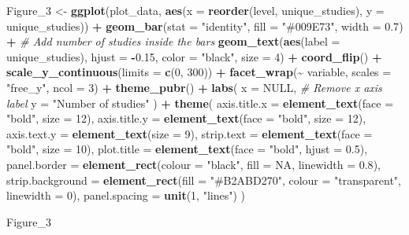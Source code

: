\documentclass[
]{article}
\newenvironment{Shaded}{\begin{snugshade}}{\end{snugshade}}
\newcommand{\AttributeTok}[1]{\textcolor[rgb]{0.13,0.29,0.53}{#1}}
\newcommand{\CommentTok}[1]{\textcolor[rgb]{0.56,0.35,0.01}{\textit{#1}}}
\newcommand{\ConstantTok}[1]{\textcolor[rgb]{0.56,0.35,0.01}{#1}}
\newcommand{\DecValTok}[1]{\textcolor[rgb]{0.00,0.00,0.81}{#1}}
\newcommand{\FloatTok}[1]{\textcolor[rgb]{0.00,0.00,0.81}{#1}}
\newcommand{\FunctionTok}[1]{\textcolor[rgb]{0.13,0.29,0.53}{\textbf{#1}}}
\newcommand{\NormalTok}[1]{#1}
\newcommand{\OtherTok}[1]{\textcolor[rgb]{0.56,0.35,0.01}{#1}}
\newcommand{\SpecialCharTok}[1]{\textcolor[rgb]{0.81,0.36,0.00}{\textbf{#1}}}
\newcommand{\StringTok}[1]{\textcolor[rgb]{0.31,0.60,0.02}{#1}}
\begin{document}
\begin{Shaded}
\begin{Highlighting}[]
\NormalTok{Figure\_3 }\OtherTok{\textless{}{-}} 
  \FunctionTok{ggplot}\NormalTok{(plot\_data, }\FunctionTok{aes}\NormalTok{(}\AttributeTok{x =} \FunctionTok{reorder}\NormalTok{(level, unique\_studies), }\AttributeTok{y =}\NormalTok{ unique\_studies)) }\SpecialCharTok{+}
  \FunctionTok{geom\_bar}\NormalTok{(}\AttributeTok{stat =} \StringTok{"identity"}\NormalTok{, }\AttributeTok{fill =} \StringTok{"\#009E73"}\NormalTok{, }\AttributeTok{width =} \FloatTok{0.7}\NormalTok{) }\SpecialCharTok{+}
  \CommentTok{\# Add number of studies inside the bars}
  \FunctionTok{geom\_text}\NormalTok{(}\FunctionTok{aes}\NormalTok{(}\AttributeTok{label =}\NormalTok{ unique\_studies), }
            \AttributeTok{hjust =} \SpecialCharTok{{-}}\FloatTok{0.15}\NormalTok{, }\AttributeTok{color =} \StringTok{"black"}\NormalTok{, }\AttributeTok{size =} \DecValTok{4}\NormalTok{) }\SpecialCharTok{+}
  \FunctionTok{coord\_flip}\NormalTok{() }\SpecialCharTok{+}
  \FunctionTok{scale\_y\_continuous}\NormalTok{(}\AttributeTok{limits =} \FunctionTok{c}\NormalTok{(}\DecValTok{0}\NormalTok{, }\DecValTok{300}\NormalTok{)) }\SpecialCharTok{+}
  \FunctionTok{facet\_wrap}\NormalTok{(}\SpecialCharTok{\textasciitilde{}}\NormalTok{ variable, }\AttributeTok{scales =} \StringTok{"free\_y"}\NormalTok{, }\AttributeTok{ncol =} \DecValTok{3}\NormalTok{) }\SpecialCharTok{+}
  \FunctionTok{theme\_pubr}\NormalTok{() }\SpecialCharTok{+}
  \FunctionTok{labs}\NormalTok{(}
    \AttributeTok{x =} \ConstantTok{NULL}\NormalTok{,  }\CommentTok{\# Remove x axis label}
    \AttributeTok{y =} \StringTok{"Number of studies"}
\NormalTok{  ) }\SpecialCharTok{+}
  \FunctionTok{theme}\NormalTok{(}
    \AttributeTok{axis.title.x =} \FunctionTok{element\_text}\NormalTok{(}\AttributeTok{face =} \StringTok{"bold"}\NormalTok{, }\AttributeTok{size =} \DecValTok{12}\NormalTok{),}
    \AttributeTok{axis.title.y =} \FunctionTok{element\_text}\NormalTok{(}\AttributeTok{face =} \StringTok{"bold"}\NormalTok{, }\AttributeTok{size =} \DecValTok{12}\NormalTok{),}
    \AttributeTok{axis.text.y =} \FunctionTok{element\_text}\NormalTok{(}\AttributeTok{size =} \DecValTok{9}\NormalTok{),}
    \AttributeTok{strip.text =} \FunctionTok{element\_text}\NormalTok{(}\AttributeTok{face =} \StringTok{"bold"}\NormalTok{, }\AttributeTok{size =} \DecValTok{10}\NormalTok{),}
    \AttributeTok{plot.title =} \FunctionTok{element\_text}\NormalTok{(}\AttributeTok{face =} \StringTok{"bold"}\NormalTok{, }\AttributeTok{hjust =} \FloatTok{0.5}\NormalTok{),}
    \AttributeTok{panel.border =} \FunctionTok{element\_rect}\NormalTok{(}\AttributeTok{colour =} \StringTok{"black"}\NormalTok{, }\AttributeTok{fill =} \ConstantTok{NA}\NormalTok{, }\AttributeTok{linewidth =} \FloatTok{0.8}\NormalTok{),}
    \AttributeTok{strip.background =} \FunctionTok{element\_rect}\NormalTok{(}\AttributeTok{fill =} \StringTok{"\#B2ABD270"}\NormalTok{, }\AttributeTok{colour =} \StringTok{"transparent"}\NormalTok{, }\AttributeTok{linewidth =} \DecValTok{0}\NormalTok{),}
    \AttributeTok{panel.spacing =} \FunctionTok{unit}\NormalTok{(}\DecValTok{1}\NormalTok{, }\StringTok{"lines"}\NormalTok{)}
\NormalTok{  )}

\NormalTok{Figure\_3}
\end{Highlighting}
\end{Shaded}
\end{document}
